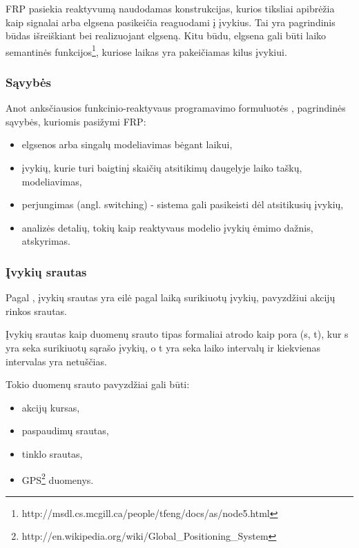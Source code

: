 FRP pasiekia reaktyvumą naudodamas konstrukcijas, kurios tiksliai apibrėžia kaip signalai arba elgsena pasikeičia reaguodami į įvykius. Tai yra pagrindinis būdas išreiškiant bei realizuojant elgseną. Kitu būdu, elgsena gali būti laiko semantinės funkcijos\footnote{http://msdl.cs.mcgill.ca/people/tfeng/docs/as/node5.html}, kuriose laikas yra pakeičiamas kilus įvykiui.

\subsubsection{Sąvybės}

Anot anksčiausios funkcinio-reaktyvaus programavimo formuluotės \cite{ElliottHudak97:Fran}, pagrindinės sąvybės, kuriomis pasižymi FRP:

\begin{itemize}

	\item elgsenos arba singalų modeliavimas bėgant laikui,

	\item įvykių, kurie turi baigtinį skaičių atsitikimų daugelyje laiko taškų, modeliavimas,

	\item perjungimas (angl. switching) - sistema gali pasikeisti dėl atsitikusių įvykių,

	\item analizės detalių, tokių kaip reaktyvaus modelio įvykių ėmimo dažnis, atskyrimas.

\end{itemize}

\subsubsection{Įvykių srautas}

Pagal \cite{Bass:2007:Mythbusters}, įvykių srautas yra eilė pagal laiką surikiuotų įvykių, pavyzdžiui akcijų rinkos srautas.

Įvykių srautas kaip duomenų srauto tipas formaliai atrodo kaip pora (s, t), kur s yra seka surikiuotų sąrašo įvykių, o t yra seka laiko intervalų ir kiekvienas intervalas yra netuščias.

Tokio duomenų srauto pavyzdžiai gali būti:

\begin{itemize}

	\item akcijų kursas,

	\item paspaudimų srautas,

	\item tinklo srautas,

	\item GPS\footnote{http://en.wikipedia.org/wiki/Global\_Positioning\_System} duomenys.

\end{itemize}

